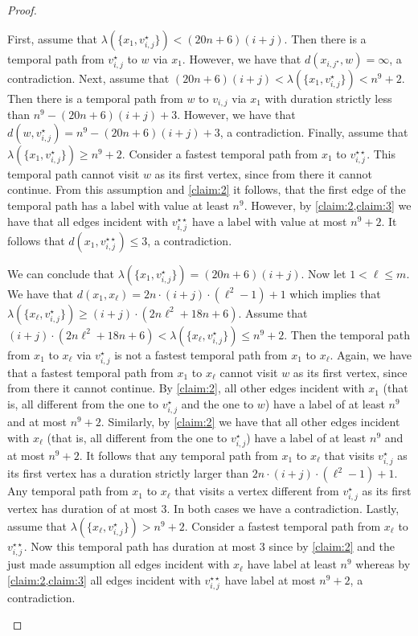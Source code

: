 \documentclass[a4paper,UKenglish,cleveref, autoref, thm-restate]{lipics-v2021}
\begin{document}
\begin{proof}
\begin{claimproof}
    First, assume that $\lambda(\{x_1,v_{i,j}^{\star}\})<(20n+6)(i+j)$. Then there is a temporal path from $v_{i,j}^\star$ to $w$ via $x_1$. However, we have that $d(x_{i,j^\star},w)=\infty$, a contradiction.
    Next, assume that $(20n+6)(i+j)<\lambda(\{x_1,v_{i,j}^{\star}\})<n^9+2$. Then there is a temporal path from $w$ to $v_{i,j}$ via $x_1$ with duration strictly less than $n^9-(20n+6)(i+j)+3$. However, we have that $d(w,v_{i,j}^\star)=n^9-(20n+6)(i+j)+3$, a contradiction.
    Finally, assume that $\lambda(\{x_1,v_{i,j}^{\star}\})\ge n^9+2$. Consider a fastest temporal path from $x_1$ to $v_{i,j}^{\star\star}$. This temporal path cannot visit $w$ as its first vertex, since from there it cannot continue. 
    From this assumption and \cref{claim:2} it follows, that the first edge of the temporal path has a label with value at least $n^9$. However, by \cref{claim:2,claim:3} we have that all edges incident with $v_{i,j}^{\star\star}$ have a label with value at most $n^9+2$. It follows that $d(x_1,v_{i,j}^{\star\star})\le 3$, a contradiction.

    We can conclude that $\lambda(\{x_1,v_{i,j}^{\star}\})=(20n+6)(i+j)$. Now let $1<\ell\le m$. We have that $d(x_1,x_\ell)=2n\cdot (i+j)\cdot(\ell^2-1)+1$ which implies that $\lambda(\{x_\ell,v_{i,j}^{\star}\})\ge (i+j)\cdot (2n\ell^2 +18n+6)$. Assume that $(i+j)\cdot (2n\ell^2 +18n+6) <\lambda(\{x_\ell,v_{i,j}^{\star}\})\le n^9+2$. Then the temporal path from $x_1$ to $x_\ell$ via $v_{i,j}^\star$ is not a fastest temporal path from $x_1$ to $x_\ell$. Again, we have that a fastest temporal path from $x_1$ to $x_\ell$ cannot visit $w$ as its first vertex, since from there it cannot continue. By \cref{claim:2}, all other edges incident with $x_1$ (that is, all different from the one to $v_{i,j}^\star$ and the one to $w$) have a label of at least $n^9$ and at most $n^9+2$. Similarly, by \cref{claim:2} we have that all other edges incident with $x_\ell$ (that is, all different from the one to $v_{i,j}^\star$) have a label of at least $n^9$ and at most $n^9+2$. It follows that any temporal path from $x_1$ to $x_\ell$ that visits $v_{i,j}^\star$ as its first vertex has a duration strictly larger than $2n\cdot (i+j)\cdot(\ell^2-1)+1$. Any temporal path from $x_1$ to $x_\ell$ that visits a vertex different from $v_{i,j}^\star$ as its first vertex has duration of at most $3$. In both cases we have a contradiction. 
    Lastly, assume that $\lambda(\{x_\ell,v_{i,j}^{\star}\})> n^9+2$. Consider a fastest temporal path from $x_\ell$ to $v_{i,j}^{\star\star}$. Now this temporal path has duration at most 3 since by \cref{claim:2} and the just made assumption all edges incident with $x_\ell$ have label at least $n^9$ whereas by \cref{claim:2,claim:3} all edges incident with $v_{i,j}^{\star\star}$ have label at most $n^9+2$, a contradiction. 
\end{claimproof}


\end{proof}
\end{document}
